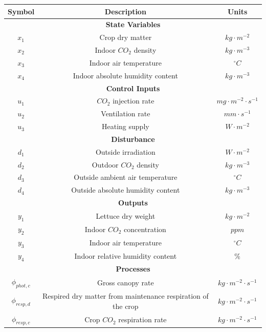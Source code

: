 \begin{table}[H]
	\centering
	\begin{tabular}{|c|c|c|}
		\hline
		\textbf{Symbol} & \textbf{Description} & \textbf{Units} \\ \hline
		\multicolumn{3}{|c|}{\textbf{State Variables}} \\ \hline
		 $x_1$ & Crop dry matter & $kg \cdot m^{-2}$ \\ 
		 $x_2$ & Indoor $CO_2$ density & $kg \cdot m^{-3}$ \\ 
		 $x_3$ & Indoor air temperature & $^{\circ}C$ \\ 
		 $x_4$ & Indoor absolute humidity content & $kg \cdot m^{-3}$ \\ \hline
		\multicolumn{3}{|c|}{\textbf{Control Inputs}} \\ \hline
		 $u_1$ & $CO_2$ injection rate & $mg \cdot m^{-2} \cdot s^{-1}$ \\ 
		 $u_2$ & Ventilation rate & $mm \cdot s^{-1}$ \\ 
		 $u_3$ & Heating supply & $W \cdot m^{-2}$ \\ \hline
		\multicolumn{3}{|c|}{\textbf{Disturbance}} \\ \hline
		 $d_1$ & Outside irradiation & $W \cdot m^{-2}$ \\ 
		 $d_2$ & Outdoor $CO_2$ density & $kg \cdot m^{-3}$ \\ 
		 $d_3$ & Outside ambient air temperature & $^{\circ}C$ \\ 
		 $d_4$ & Outside absolute humidity content & $kg \cdot m^{-3}$ \\ \hline
		\multicolumn{3}{|c|}{\textbf{Outputs}} \\ \hline
		 $y_1$ & Lettuce dry weight & $kg \cdot m^{-2}$ \\ 
		 $y_2$ & Indoor $CO_2$ concentration & $ppm$ \\ 
		 $y_3$ & Indoor air temperature & $^{\circ}C$ \\ 
		 $y_4$ & Indoor relative humidity content & \% \\ \hline
		\multicolumn{3}{|c|}{\textbf{Processes}} \\ \hline
		 $\phi_{phot,c}$ & Gross canopy rate & $kg \cdot m^{-2} \cdot s^{-1}$ \\ 
		 $\phi_{resp,d}$ & Respired dry matter from maintenance respiration of the crop & $kg \cdot m^{-2} \cdot s^{-1}$ \\ 
		 $\phi_{resp,c}$ & Crop $CO_2$ respiration rate & $kg \cdot m^{-2} \cdot s^{-1}$ \\ 

\end{tabular}
\end{table}
